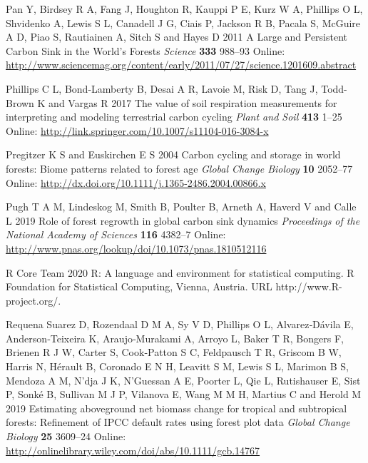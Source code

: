 \documentclass[
]{article}
\newlength{\cslhangindent}
\newenvironment{cslreferences}%
  {\setlength{\parindent}{0pt}%
  \everypar{\setlength{\hangindent}{\cslhangindent}}\ignorespaces}%
  {\par}
\begin{document}
\begin{cslreferences}
\leavevmode\hypertarget{ref-pan_large_2011}{}%
Pan Y, Birdsey R A, Fang J, Houghton R, Kauppi P E, Kurz W A, Phillips O
L, Shvidenko A, Lewis S L, Canadell J G, Ciais P, Jackson R B, Pacala S,
McGuire A D, Piao S, Rautiainen A, Sitch S and Hayes D 2011 A Large and
Persistent Carbon Sink in the World's Forests \emph{Science}
\textbf{333} 988--93 Online:
\url{http://www.sciencemag.org/content/early/2011/07/27/science.1201609.abstract}

\leavevmode\hypertarget{ref-phillips_value_2017}{}%
Phillips C L, Bond-Lamberty B, Desai A R, Lavoie M, Risk D, Tang J,
Todd-Brown K and Vargas R 2017 The value of soil respiration
measurements for interpreting and modeling terrestrial carbon cycling
\emph{Plant and Soil} \textbf{413} 1--25 Online:
\url{http://link.springer.com/10.1007/s11104-016-3084-x}

\leavevmode\hypertarget{ref-pregitzer_carbon_2004}{}%
Pregitzer K S and Euskirchen E S 2004 Carbon cycling and storage in
world forests: Biome patterns related to forest age \emph{Global Change
Biology} \textbf{10} 2052--77 Online:
\url{http://dx.doi.org/10.1111/j.1365-2486.2004.00866.x}

\leavevmode\hypertarget{ref-pugh_role_2019}{}%
Pugh T A M, Lindeskog M, Smith B, Poulter B, Arneth A, Haverd V and
Calle L 2019 Role of forest regrowth in global carbon sink dynamics
\emph{Proceedings of the National Academy of Sciences} \textbf{116}
4382--7 Online:
\url{http://www.pnas.org/lookup/doi/10.1073/pnas.1810512116}

\leavevmode\hypertarget{ref-r_core_team_r_2020}{}%
R Core Team 2020 R: A language and environment for statistical
computing. R Foundation for Statistical Computing, Vienna, Austria. URL
http://www.R-project.org/.

\leavevmode\hypertarget{ref-requena_suarez_estimating_2019}{}%
Requena Suarez D, Rozendaal D M A, Sy V D, Phillips O L, Alvarez‐Dávila
E, Anderson‐Teixeira K, Araujo‐Murakami A, Arroyo L, Baker T R, Bongers
F, Brienen R J W, Carter S, Cook‐Patton S C, Feldpausch T R, Griscom B
W, Harris N, Hérault B, Coronado E N H, Leavitt S M, Lewis S L, Marimon
B S, Mendoza A M, N'dja J K, N'Guessan A E, Poorter L, Qie L,
Rutishauser E, Sist P, Sonké B, Sullivan M J P, Vilanova E, Wang M M H,
Martius C and Herold M 2019 Estimating aboveground net biomass change
for tropical and subtropical forests: Refinement of IPCC default rates
using forest plot data \emph{Global Change Biology} \textbf{25} 3609--24
Online: \url{http://onlinelibrary.wiley.com/doi/abs/10.1111/gcb.14767}


\end{cslreferences}
\end{document}
